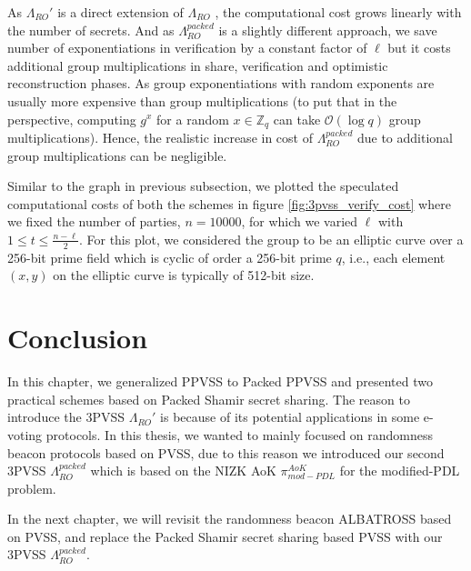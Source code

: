 As $\Lambda_{RO}'$ is a direct extension of $\Lambda_{RO}$ 
\cite{cryptoeprint:2025/576}, the computational 
cost grows linearly with the number of secrets. And as $\Lambda_{RO}^{packed}$ is a slightly 
different approach, we save number of exponentiations in verification by a constant factor of 
$\ell$ but it costs additional group multiplications in share, verification and optimistic 
reconstruction phases. As group exponentiations with random exponents are usually more 
expensive than group multiplications (to put that in the perspective, computing $g^x$ for 
a random $x\in\mathbb{Z}_q$ can take $\mathcal{O}(\log{q})$ group multiplications). 
Hence, the realistic increase in cost of $\Lambda_{RO}^{packed}$ due to additional 
group multiplications can be negligible. 




Similar to the graph in previous subsection, we plotted the speculated computational costs of both the 
schemes in figure \ref{fig:3pvss_verify_cost} where we fixed the number of parties, $n=10000$, 
for which we varied $\ell$ with $1\leq t\leq \frac{n-\ell}{2}$. For this plot, we 
considered the group to be an elliptic curve over a 256-bit prime field which is 
cyclic of order a 256-bit prime $q$, i.e., each element $(x,y)$ on the elliptic curve 
is typically of 512-bit size.\par




% 


\section{Conclusion}
In this chapter, we generalized PPVSS to Packed PPVSS and presented two practical schemes based on 
Packed Shamir secret sharing. The reason to introduce the 3PVSS $\Lambda_{RO}'$ is because of its 
potential applications in some e-voting protocols. In this thesis, we wanted to mainly focused on randomness beacon 
protocols based on PVSS, due to this reason we introduced our second 3PVSS $\Lambda_{RO}^{packed}$ which is based on the
NIZK AoK $\pi_{mod-PDL}^{AoK}$ for the modified-PDL problem.\par

In the next chapter, we will revisit the randomness beacon ALBATROSS \cite{cryptoeprint:2020/644} based on PVSS, 
and replace the Packed Shamir secret sharing based PVSS with our 3PVSS $\Lambda_{RO}^{packed}$. 

